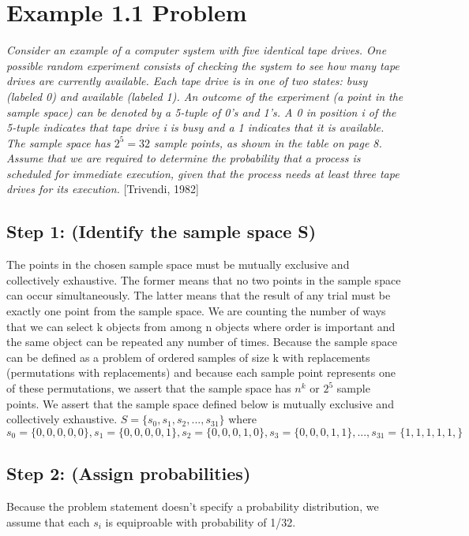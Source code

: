 \documentclass[a4paper,10pt]{article}
\title{}
\author{Mark Johnson \\
Loyola University Chicago}
\date {mjohnson4@luc.edu}
\begin{document}
\maketitle
\section{Example 1.1 Problem}
\emph{Consider an example of a computer system with five identical tape drives. One possible random experiment 
consists of checking the system to see how many tape drives are currently available. Each tape drive is in one of 
two states: busy (labeled 0) and available (labeled 1). An outcome of the experiment (a point in the sample space) 
can be denoted by a 5-tuple of 0's and 1's. A 0 in position i of the 5-tuple indicates that tape drive i is busy and 
a 1 indicates that it is available. The sample space has $ 2^{5}=32 $ sample points, as shown in the table on page 8. 
Assume that we are required to determine the probability that a process is scheduled for immediate execution, given 
that the process needs at least three tape drives for its execution.} [Trivendi, 1982]
\subsection{Step 1: (Identify the sample space S)}
The points in the chosen sample space must be mutually exclusive and collectively exhaustive. The former means that 
no two points in the sample space can occur simultaneously. The latter means that the result of any trial must be exactly 
one point from the sample space. We are counting the number of ways that we can select k objects from among n 
objects where order is important and the same object can be repeated any number of times. Because the sample space 
can be defined as a problem of ordered samples of size k with replacements (permutations with replacements) and because each sample point represents one of these 
permutations, we assert that the sample space has $ n^{k} $ or $ 2^{5} $ sample points. We assert that the sample 
space defined below is mutually exclusive and collectively exhaustive. \newline
$ S = \{s_{0}, s_{1}, s_{2},..., s_{31}\} $ where \newline
$ s_{0} = \{0,0,0,0,0\}, s_{1} = \{0,0,0,0,1\}, s_{2} = \{0,0,0,1,0\}, s_{3} = \{0,0,0,1,1\},..., s_{31} = \{1,1,1,1,1,\} $
\subsection{Step 2: (Assign probabilities)}
Because the problem statement doesn't specify a probability distribution, we assume that each $ s_{i} $ is 
equiproable with probability of 1/32.
\end{document}
